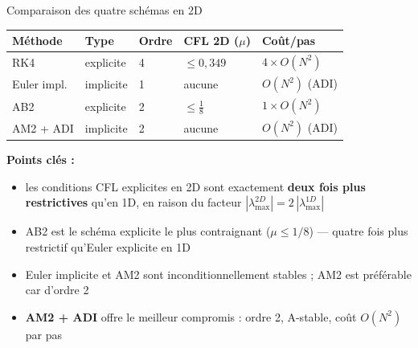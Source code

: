 \documentclass[10pt]{beamer}
\begin{document}
\begin{frame}{Comparaison des quatre schémas en 2D}

\begin{tabular}{@{}lllll@{}}
  \toprule
  Méthode & Type & Ordre & CFL 2D ($\mu$) & Coût/pas \\
  \midrule
  RK4         & explicite & 4 & $\leq 0{,}349$      & $4 \times O(N^2)$ \\[4pt]
  Euler impl. & implicite & 1 & aucune              & $O(N^2)$ (ADI) \\[4pt]
  AB2         & explicite & 2 & $\leq \frac{1}{8}$  & $1 \times O(N^2)$ \\[4pt]
  AM2 + ADI   & implicite & 2 & aucune              & $O(N^2)$ (ADI) \\
  \bottomrule
\end{tabular}

\bigskip

\textbf{Points clés :}

\begin{itemize}
  \item les conditions CFL explicites en 2D sont exactement \textbf{deux fois plus
        restrictives} qu'en 1D, en raison du facteur $|\lambda_{\max}^{2D}| = 2\,|\lambda_{\max}^{1D}|$
  \item AB2 est le schéma explicite le plus contraignant ($\mu \leq 1/8$) —
        quatre fois plus restrictif qu'Euler explicite en 1D
  \item Euler implicite et AM2 sont inconditionnellement stables ;
        AM2 est préférable car d'ordre 2
  \item \textbf{AM2 + ADI} offre le meilleur compromis :
        ordre 2, A-stable, coût $O(N^2)$ par pas
\end{itemize}

\end{frame}
\end{document}
